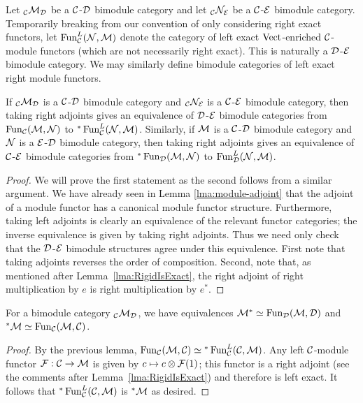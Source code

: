 \documentclass{amsart}
\begin{document}
\begin{definition}
	Let ${}_{\mathcal C}\mathcal M_\mathcal D$ be a $\mathcal C$-$\mathcal D$ bimodule category and let ${}_{\mathcal C}\mathcal N_\mathcal E$ be a $\mathcal C$-$\mathcal E$ bimodule category. Temporarily breaking from our convention of only considering right exact functors, let	 $\operatorname{Fun}^L_{\mathcal C}(\mathcal N, \mathcal M)$ denote the category of left exact $\mathrm{Vect}$-enriched $\mathcal C$-module functors (which are not necessarily right exact). This is naturally a $\mathcal D$-$\mathcal E$ bimodule category. We may similarly define bimodule categories of left exact right module functors. 
\end{definition}

\begin{lemma}
If ${}_{\mathcal C}\mathcal M_\mathcal D$ is a $\mathcal C$-$\mathcal D$ bimodule category and ${}_{\mathcal C}\mathcal N_\mathcal E$ is a $\mathcal C$-$\mathcal E$ bimodule category, then taking right adjoints gives an equivalence of $\mathcal D$-$\mathcal E$ bimodule categories 
from $\operatorname{Fun}_{\mathcal C}(\mathcal M, \mathcal N)$ to ${}^*\operatorname{Fun}^L_{\mathcal C}(\mathcal N, \mathcal M)$.
Similarly, if $\mathcal M$ is a $\mathcal C$-$\mathcal D$ bimodule category and $\mathcal N$ is a $\mathcal E$-$\mathcal D$ bimodule category, then taking right adjoints gives an equivalence of $\mathcal C$-$\mathcal E$ bimodule categories from ${}^*\operatorname{Fun}_{\mathcal D}(\mathcal M, \mathcal N)$ to $\operatorname{Fun}^L_{\mathcal D}(\mathcal N, \mathcal M)$. 
\end{lemma}
\begin{proof}
	We will prove the first statement as the second follows from a similar argument. 
We have already seen in Lemma \ref{lma:module-adjoint} that the adjoint of a module functor has a canonical module functor structure.  Furthermore, taking left adjoints is clearly an equivalence of the relevant functor categories; the inverse equivalence is given by taking right adjoints. Thus we need only check that the $\mathcal D$-$\mathcal E$ bimodule structures agree under this equivalence.  First note that taking adjoints reverses the order of composition. Second, note that, as mentioned after Lemma~\ref{lma:RigidIsExact}, the right adjoint of right multiplication by $e$ is right multiplication by $e^*$.  
\end{proof}

\begin{lemma} \label{lem:dual-formula-for-adjoints}
For a bimodule category ${}_\mathcal C \mathcal M_\mathcal D$, we have equivalences $\mathcal M^* \simeq \operatorname{Fun}_{\mathcal D}(\mathcal M, \mathcal D)$ and ${}^*\mathcal M \simeq \operatorname{Fun}_{\mathcal C}(\mathcal M, \mathcal C)$.
\end{lemma}
\begin{proof}
By the previous lemma, $\operatorname{Fun}_{\mathcal C}(\mathcal M, \mathcal C) \simeq {}^*\operatorname{Fun}_{\mathcal C}^L(\mathcal C, \mathcal M)$.  Any left $\mathcal C$-module functor $\mathcal F: \mathcal C \rightarrow \mathcal M$ is given by $c \mapsto c \otimes \mathcal F(1)$; this functor is a right adjoint (see the comments after Lemma~\ref{lma:RigidIsExact}) and therefore is left exact.  It follows that ${}^*\operatorname{Fun}_{\mathcal C}^L(\mathcal C, \mathcal M)$ is ${}^* \mathcal M$ as desired.
\end{proof}
\end{document}
